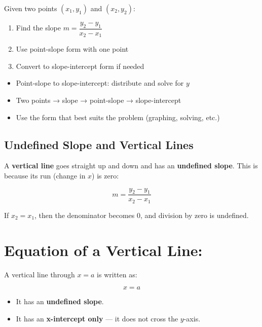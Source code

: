 \documentclass[11pt]{article}
\begin{document}
Given two points \( (x_1, y_1) \) and \( (x_2, y_2) \):
\begin{enumerate}
  \item Find the slope \( m = \dfrac{y_2 - y_1}{x_2 - x_1} \)
  \item Use point-slope form with one point
  \item Convert to slope-intercept form if needed
\end{enumerate}

\begin{tcolorbox}[colback=purple!5!white, colframe=purple!80!black, title=Summary: Converting Forms]
\begin{itemize}
  \item Point-slope to slope-intercept: distribute and solve for \( y \)
  \item Two points → slope → point-slope → slope-intercept
  \item Use the form that best suits the problem (graphing, solving, etc.)
\end{itemize}
\end{tcolorbox}
\subsection{Undefined Slope and Vertical Lines}

A \textbf{vertical line} goes straight up and down and has an \textbf{undefined slope}. This is because its run (change in \( x \)) is zero:

\[
m = \frac{y_2 - y_1}{x_2 - x_1}
\]

If \( x_2 = x_1 \), then the denominator becomes 0, and division by zero is undefined.

\section*{Equation of a Vertical Line:}
A vertical line through \( x = a \) is written as:

\[
x = a
\]

\begin{itemize}
  \item It has an \textbf{undefined slope}.
  \item It has an \textbf{x-intercept only} — it does not cross the \( y \)-axis.
\end{itemize}

\begin{center}
\end{center}
\end{document}

